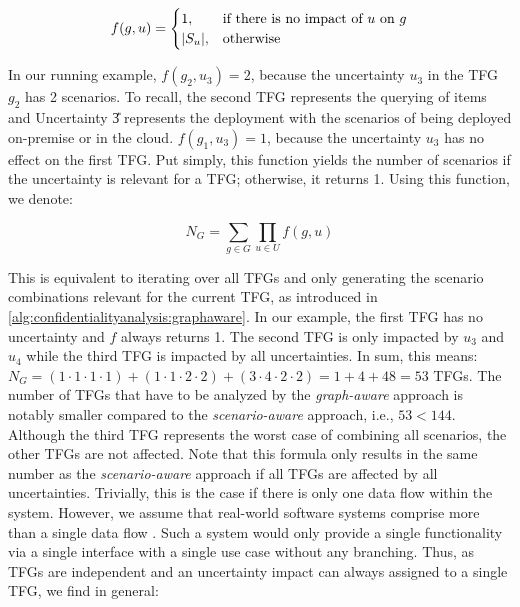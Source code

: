 \begin{equation*}
    f(g,u) = 
    \begin{cases}
        1,& \text{if there is no impact of } u \text{ on } g\\
        \lvert S_{u}\rvert,& \text{otherwise}
    \end{cases}
\end{equation*}

In our running example, $f(g_{2},u_{3}) = 2$, because the uncertainty $u_{3}$ in the \ac{TFG} $g_{2}$ has 2 scenarios.
To recall, the second \ac{TFG} represents the querying of items and Uncertainty \U{3} represents the deployment with the scenarios of being deployed on-premise or in the cloud.
$f(g_{1},u_{3}) = 1$, because the uncertainty $u_{3}$ has no effect on the first \ac{TFG}.
Put simply, this function yields the number of scenarios if the uncertainty is relevant for a \ac{TFG}; otherwise, it returns 1.
Using this function, we denote:

\begin{equation*}
    N_{G} = \sum_{g \in G} \prod_{u \in U} f(g,u)
\end{equation*}

This is equivalent to iterating over all \acp{TFG} and only generating the scenario combinations relevant for the current \ac{TFG}, as introduced in \autoref{alg:confidentialityanalysis:graphaware}.
In our example, the first \ac{TFG} has no uncertainty and $f$ always returns 1.
The second \ac{TFG} is only impacted by $u_{3}$ and $u_{4}$ while the third \ac{TFG} is impacted by all uncertainties.
In sum, this means: $N_{G} = (1 \cdot 1 \cdot 1 \cdot 1) + (1 \cdot 1 \cdot 2 \cdot 2) + (3 \cdot 4 \cdot 2 \cdot 2) = 1 + 4 + 48 = 53$ \acp{TFG}.
The number of \acp{TFG} that have to be analyzed by the \emph{graph-aware} approach is notably smaller compared to the \emph{scenario-aware} approach, i.e., $53 < 144$.
Although the third \ac{TFG} represents the worst case of combining all scenarios, the other \acp{TFG} are not affected.
Note that this formula only results in the same number as the \emph{scenario-aware} approach if all \acp{TFG} are affected by all uncertainties.
Trivially, this is the case if there is only one data flow within the system.
However, we assume that real-world software systems comprise more than a single data flow \cite{hahner_architecture-based_2023}.
Such a system would only provide a single functionality via a single interface with a single use case without any branching.
Thus, as \acp{TFG} are independent and an uncertainty impact can always assigned to a single \ac{TFG}, we find in general: 

